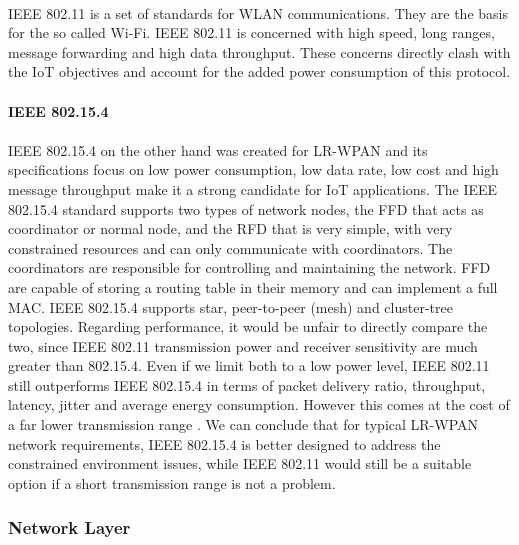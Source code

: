 \paragraph{}
IEEE 802.11 \cite{IEEE2012} is a set of standards for \ac{WLAN} communications. They are the basis for the so called Wi-Fi. IEEE 802.11 is concerned with high speed, long ranges, message forwarding and high data throughput. These concerns directly clash with the \ac{IoT} objectives and account for the added power consumption of this protocol.

\paragraph{\textbf{IEEE 802.15.4}}
\paragraph{}
IEEE 802.15.4 \cite{IEEEComputerSociety2011} on the other hand was created for \ac{LR-WPAN} and its specifications focus on low power consumption, low data rate, low cost and high message throughput make it a strong candidate for \ac{IoT} applications.
	The IEEE 802.15.4 standard supports two types of network nodes, the \ac{FFD} that acts as coordinator or normal node, and the \ac{RFD} that is very simple, with very constrained resources and can only communicate with coordinators. The coordinators are responsible for controlling and maintaining the network. \ac{FFD} are capable of storing a routing table in their memory and can implement a full \ac{MAC}.
	IEEE 802.15.4 supports star, peer-to-peer (mesh) and cluster-tree topologies.
	Regarding performance, it would be unfair to directly compare the two, since IEEE 802.11 transmission power and receiver sensitivity are much greater than 802.15.4. Even if we limit both to a low power level, IEEE 802.11 still outperforms IEEE 802.15.4 in terms of packet delivery ratio, throughput, latency, jitter and average energy consumption. However this comes at the cost of a far lower transmission range \cite{Transmission2011}.
	We can conclude that for typical \ac{LR-WPAN} network requirements, IEEE 802.15.4 is better designed to address the constrained environment issues, while IEEE 802.11 would still be a suitable option if a short transmission range is not a problem.

\subsubsection{Network Layer}
\label{sec:network_layer}

